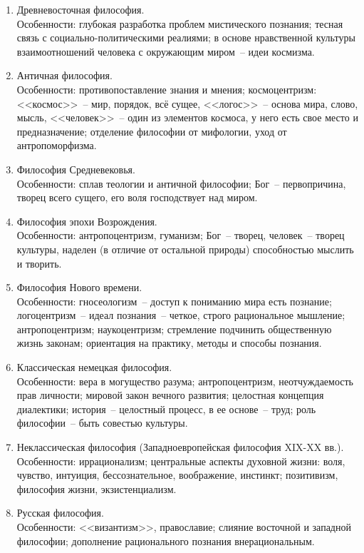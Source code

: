 \begin{enumerate}
    \item Древневосточная философия.\\
        Особенности: глубокая разработка проблем мистического познания;
        тесная связь с социально-политическими реалиями;
        в основе нравственной культуры взаимоотношений человека с окружающим миром~-- идеи космизма.
    \item Античная философия.\\
        Особенности: противопоставление знания и мнения;
        космоцентризм: <<космос>>~-- мир, порядок, всё сущее, <<логос>>~-- основа мира, слово, мысль,
        <<человек>>~-- один из элементов космоса, у него есть свое место и предназначение;
        отделение философии от мифологии, уход от антропоморфизма.
    \item Философия Средневековья.\\
        Особенности: сплав теологии и античной философии;
        Бог~-- первопричина, творец всего сущего, его воля господствует над миром.
    \item Философия эпохи Возрождения.\\
        Особенности: антропоцентризм, гуманизм;
        Бог~-- творец, человек~-- творец культуры, наделен (в отличие от остальной природы) способностью
        мыслить и творить.
    \item Философия Нового времени.\\
        Особенности: гносеологизм~-- доступ к пониманию мира есть познание;
        логоцентризм~-- идеал познания~-- четкое, строго рациональное мышление;
        антропоцентризм;
        наукоцентризм;
        стремление подчинить общественную жизнь законам;
        ориентация на практику, методы и способы познания.
    \item Классическая немецкая философия.\\
        Особенности: вера в могущество разума;
        антропоцентризм, неотчуждаемость прав личности;
        мировой закон вечного развития;
        целостная концепция диалектики;
        история~-- целостный процесс, в ее основе~-- труд;
        роль философии~-- быть совестью культуры.
    \item Неклассическая философия (Западноевропейская философия XIX-XX вв.).\\
        Особенности: иррационализм;
        центральные аспекты духовной жизни: воля, чувство, интуиция, бессознательное, воображение,
        инстинкт;
        позитивизм, философия жизни, экзистенциализм.
    \item Русская философия.\\
	    Особенности:
	    <<византизм>>, православие;
	    слияние восточной и западной философии;
	    дополнение рационального познания внерациональным.
\end{enumerate}
	    
